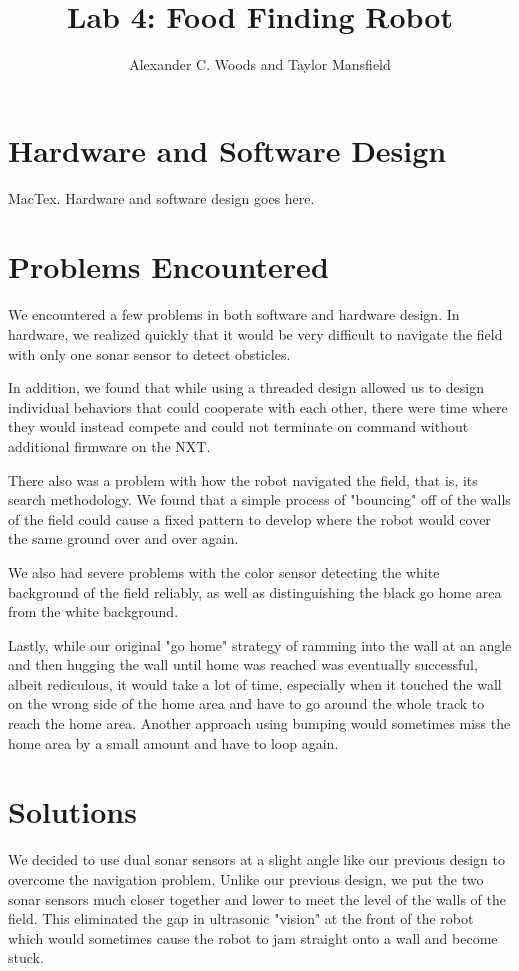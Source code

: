 \documentclass[journal]{IEEEtran}
\begin{document}
\title{\LARGE \bf Lab 4: Food Finding Robot}
\author{Alexander C. Woods and Taylor Mansfield}

\maketitle

\section{Hardware and Software Design}\label{S.design}
 MacTex. Hardware and software design goes here.

\section{Problems Encountered}\label{S.problems}
We encountered a few problems in both software and hardware design. In hardware, we realized quickly that it would be very difficult to navigate the field with only one sonar sensor to detect obsticles. 

In addition, we found that while using a threaded design allowed us to design individual behaviors that could cooperate with each other, there were time where they would instead compete and could not terminate on command without additional firmware on the NXT.

There also was a problem with how the robot navigated the field, that is, its search methodology. We found that a simple process of "bouncing" off of the walls of the field could cause a fixed pattern to develop where the robot would cover the same ground over and over again. 

We also had severe problems with the color sensor detecting the white background of the field reliably, as well as distinguishing the black go home area from the white background.

Lastly, while our original "go home" strategy of ramming into the wall at an angle and then hugging the wall until home was reached was eventually successful, albeit rediculous, it would take a lot of time, especially when it touched the wall on the wrong side of the home area and have to go around the whole track to reach the home area. Another approach using bumping would sometimes miss the home area by a small amount and have to loop again.

\section{Solutions}\label{S.solutions}
We decided to use dual sonar sensors at a slight angle like our previous design to overcome the navigation problem. Unlike our previous design, we put the two sonar sensors much closer together and lower to meet the level of the walls of the field. This eliminated the gap in ultrasonic "vision" at the front of the robot which would sometimes cause the robot to jam straight onto a wall and become stuck.
\end{document}
